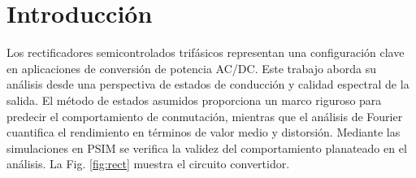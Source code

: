 \documentclass[conference]{IEEEtran}
\begin{document}
\IEEEpeerreviewmaketitle



\section{Introducción}
Los rectificadores semicontrolados trifásicos representan una configuración clave en aplicaciones de conversión de potencia AC/DC.
Este trabajo aborda su análisis desde una perspectiva de estados de conducción y calidad espectral de la salida. El método de estados asumidos proporciona un marco riguroso para predecir el
comportamiento de conmutación, mientras que el análisis de Fourier cuantifica el rendimiento en términos de valor medio y distorsión. Mediante las simulaciones en PSIM se verifica la validez del comportamiento planateado en el análisis. La Fig. \ref{fig:rect} muestra el circuito convertidor.
\end{document}
